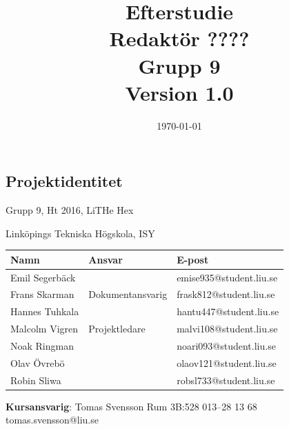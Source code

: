 \documentclass[a4paper,titlepage,12pt]{article}
\begin{document}
	\listoftodos
	\title{\LARGE
		\textbf{Efterstudie} \\
		\vspace*{0.5\baselineskip}
		\large
		Redaktör ???? \\
		Grupp 9 \\
		\small
		\vspace*{0.5\baselineskip}
		Version 1.0}
	
	\date{\today}
	
	\maketitle
	
	\newpage
	
	\begin{center}
		
		
		\section*{Projektidentitet}
		Grupp 9, Ht 2016, LiTHe Hex
		
		Linköpings Tekniska Högskola, ISY
		
		\renewcommand*{\arraystretch}{1.4}
		\begin{longtable}[c]{ l l l }
			\textbf{Namn} & \textbf{Ansvar} & \textbf{E-post} \\ \midrule
			Emil Segerbäck & & emise935@student.liu.se \\ \midrule
			Frans Skarman & Dokumentansvarig & frask812@student.liu.se \\ \midrule
			Hannes Tuhkala & & hantu447@student.liu.se \\ \midrule
			Malcolm Vigren & Projektledare & malvi108@student.liu.se \\ \midrule
			Noak Ringman &  & noari093@student.liu.se \\ \midrule
			Olav Övrebö &  & olaov121@student.liu.se \\ \midrule
			Robin Sliwa &  & robsl733@student.liu.se \\
		\end{longtable}
		
		\centering
		\textbf{Kursansvarig}: Tomas Svensson Rum 3B:528 013--28 13 68 tomas.svensson@liu.se
		
		\newpage
		\tableofcontents
		\newpage
		

\end{center}
\end{document}
